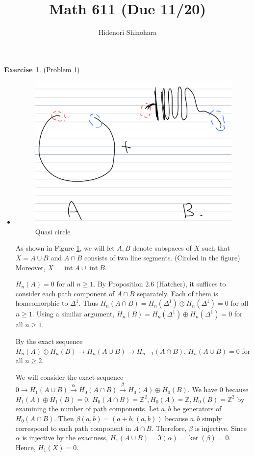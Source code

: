 \documentclass[psamsfonts]{amsart}
\theoremstyle{definition}
\newtheorem*{exer}{Exercise}
\theoremstyle{remark}
\DeclareMathOperator{\Int}{int}
\numberwithin{equation}{section}
\begin{document}
\title{Math 611 (Due 11/20)}
\author{Hidenori Shinohara}
\maketitle


\begin{exer}{(Problem 1)}
  \begin{itemize}
    \item
       \begin{figure}
       \includegraphics[width=.5\linewidth]{quasi.jpeg}
       \caption{Quasi circle}
       \label{fig:quasi}
       \end{figure}
       As shown in Figure \ref{fig:quasi}, we will let $A, B$ denote subspaces of $X$ such that $X = A \cup B$ and $A \cap B$ consists of two line segments.
       (Circled in the figure)
       Moreover, $X = \Int A \cup \Int B$.

       $H_n(A) = 0$ for all $n \geq 1$.
       By Proposition 2.6 (Hatcher), it suffices to consider each path component of $A \cap B$ separately.
       Each of them is homeomorphic to $\Delta^1$.
       Thus $H_n(A \cap B) = H_n(\Delta^1) \oplus H_n(\Delta^1) = 0$ for all $n \geq 1$.
       Using a similar argument, $H_n(B) = H_n(\Delta^1) \oplus H_n(\Delta^1) = 0$ for all $n \geq 1$.

       By the exact sequence $H_n(A) \oplus H_n(B) \rightarrow H_n(A \cup B) \rightarrow H_{n - 1}(A \cap B)$, $H_n(A \cup B) = 0$ for all $n \geq 2$.

       We will consider the exact sequence $0 \rightarrow H_1(A \cup B) \xrightarrow{\alpha} H_0(A \cap B) \xrightarrow{\beta} H_0(A) \oplus H_0(B)$.
       We have 0 because $H_1(A) \oplus H_1(B) = 0$.
       $H_0(A \cap B) = \mathbb{Z}^2, H_0(A) = \mathbb{Z}, H_0(B) = \mathbb{Z}^2$ by examining the number of path components.
       Let $a, b$ be generators of $H_0(A \cap B)$.
       Then $\beta(a, b) = (a + b, (a, b))$ because $a, b$ simply correspond to each path component in $A \cap B$.
       Therefore, $\beta$ is injective.
       Since $\alpha$ is injective by the exactness, $H_1(A \cup B) = \Im(\alpha) = \ker(\beta) = 0$.
       Hence, $H_1(X) = 0$.


\end{itemize}
\end{exer}
\end{document}
